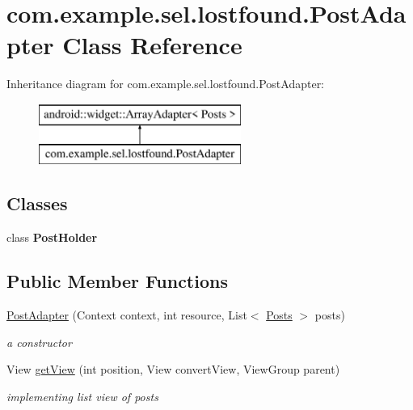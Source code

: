 \hypertarget{classcom_1_1example_1_1sel_1_1lostfound_1_1PostAdapter}{}\section{com.\+example.\+sel.\+lostfound.\+Post\+Adapter Class Reference}
\label{classcom_1_1example_1_1sel_1_1lostfound_1_1PostAdapter}
Inheritance diagram for com.\+example.\+sel.\+lostfound.\+Post\+Adapter\+:\begin{figure}[H]
\begin{center}
\leavevmode
\includegraphics[height=2.000000cm]{classcom_1_1example_1_1sel_1_1lostfound_1_1PostAdapter}
\end{center}
\end{figure}
\subsection*{Classes}
\begin{DoxyCompactItemize}
\item 
class {\bfseries Post\+Holder}
\end{DoxyCompactItemize}
\subsection*{Public Member Functions}
\begin{DoxyCompactItemize}
\item 
\hyperlink{classcom_1_1example_1_1sel_1_1lostfound_1_1PostAdapter_a58de5e8d3132dd70bfd35dcb44bf80e1}{Post\+Adapter} (Context context, int resource, List$<$ \hyperlink{classcom_1_1example_1_1sel_1_1lostfound_1_1Posts}{Posts} $>$ posts)\hypertarget{classcom_1_1example_1_1sel_1_1lostfound_1_1PostAdapter_a58de5e8d3132dd70bfd35dcb44bf80e1}{}\label{classcom_1_1example_1_1sel_1_1lostfound_1_1PostAdapter_a58de5e8d3132dd70bfd35dcb44bf80e1}

\begin{DoxyCompactList}\small\item\em a constructor \end{DoxyCompactList}\item 
View \hyperlink{classcom_1_1example_1_1sel_1_1lostfound_1_1PostAdapter_aa2f3c1364857d97091ba325de3df6226}{get\+View} (int position, View convert\+View, View\+Group parent)
\begin{DoxyCompactList}\small\item\em implementing list view of posts \end{DoxyCompactList}\end{DoxyCompactItemize}


